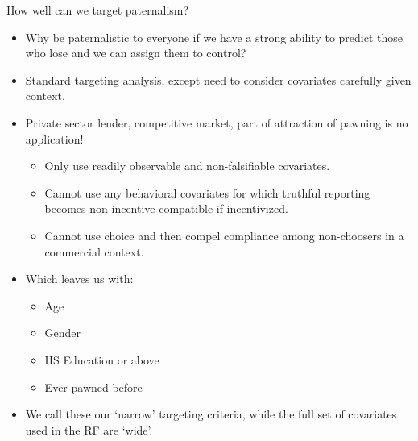 \documentclass[8pt]{beamer}
\begin{document}
\begin{frame}{How well can we target paternalism?}

\begin{itemize}
    \item   Why be paternalistic to everyone if we have a strong ability to predict those who lose and we can assign them to control?
    
     \vspace{.2in}
    
    \item   Standard targeting analysis, except need to consider covariates carefully given context.
    \item   Private sector lender, competitive market, part of attraction of pawning is no application!  
    \begin{itemize}
        \item Only use readily observable and non-falsifiable covariates.
    \item   Cannot use any behavioral covariates for which truthful reporting becomes non-incentive-compatible if incentivized.
    \item   Cannot use choice and then compel compliance among non-choosers in a commercial context.  
    \end{itemize}
    
     \vspace{.2in}
    
    \item Which leaves us with:
    \begin{itemize}
    \item   Age
    \item   Gender
    \item   HS Education or above
    \item   Ever pawned before 
    \end{itemize}
    
     \vspace{.2in}
    
    \item  We call these our `narrow' targeting criteria, while the full set of covariates used in the RF are `wide'.
\end{itemize}        


\end{frame}
\end{document}

